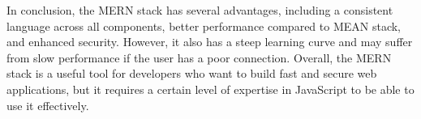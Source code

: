 In conclusion, the MERN stack has several advantages, including a consistent language across all components, better performance compared to MEAN stack, and enhanced security. However, it also has a steep learning curve and may suffer from slow performance if the user has a poor connection. Overall, the MERN stack is a useful tool for developers who want to build fast and secure web applications, but it requires a certain level of expertise in JavaScript to be able to use it effectively.